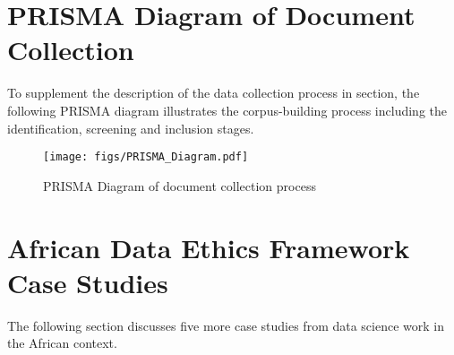 \section{PRISMA Diagram of Document Collection}
To supplement the description of the data collection process in  section, the following PRISMA diagram illustrates the corpus-building process including the identification, screening and inclusion stages. 
\label{apdx:method}
\begin{figure}[!ht]
  \centering
  \label{fig:prisma}
  \texttt{[image: figs/PRISMA\_Diagram.pdf]}
  \caption{PRISMA Diagram of document collection process}
\end{figure}

\section{African Data Ethics Framework Case Studies}
\label{apdx:more_case_studies}
The following section discusses five more case studies from data science work in the African context.
